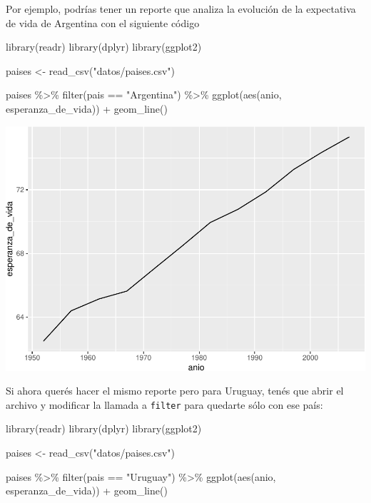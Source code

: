 \documentclass[
  openany]{book}
\newenvironment{Shaded}{\begin{snugshade}}{\end{snugshade}}
\newcommand{\FunctionTok}[1]{\textcolor[rgb]{0.00,0.00,0.00}{#1}}
\newcommand{\NormalTok}[1]{#1}
\newcommand{\OtherTok}[1]{\textcolor[rgb]{0.56,0.35,0.01}{#1}}
\newcommand{\SpecialCharTok}[1]{\textcolor[rgb]{0.00,0.00,0.00}{#1}}
\newcommand{\StringTok}[1]{\textcolor[rgb]{0.31,0.60,0.02}{#1}}
\begin{document}
Por ejemplo, podrías tener un reporte que analiza la evolución de la expectativa de vida de Argentina con el siguiente código

\begin{Shaded}
\begin{Highlighting}[]
\FunctionTok{library}\NormalTok{(readr)}
\FunctionTok{library}\NormalTok{(dplyr)}
\FunctionTok{library}\NormalTok{(ggplot2)}

\NormalTok{paises }\OtherTok{\textless{}{-}} \FunctionTok{read\_csv}\NormalTok{(}\StringTok{"datos/paises.csv"}\NormalTok{)}

\NormalTok{paises }\SpecialCharTok{\%\textgreater{}\%} 
  \FunctionTok{filter}\NormalTok{(pais }\SpecialCharTok{==} \StringTok{"Argentina"}\NormalTok{) }\SpecialCharTok{\%\textgreater{}\%} 
  \FunctionTok{ggplot}\NormalTok{(}\FunctionTok{aes}\NormalTok{(anio, esperanza\_de\_vida)) }\SpecialCharTok{+}
  \FunctionTok{geom\_line}\NormalTok{()}
\end{Highlighting}
\end{Shaded}

\begin{center}\includegraphics[width=1\linewidth]{DT6_files/figure-latex/unnamed-chunk-104-1} \end{center}

Si ahora querés hacer el mismo reporte pero para Uruguay, tenés que abrir el archivo y modificar la llamada a \texttt{filter} para quedarte sólo con ese país:

\begin{Shaded}
\begin{Highlighting}[]
\FunctionTok{library}\NormalTok{(readr)}
\FunctionTok{library}\NormalTok{(dplyr)}
\FunctionTok{library}\NormalTok{(ggplot2)}

\NormalTok{paises }\OtherTok{\textless{}{-}} \FunctionTok{read\_csv}\NormalTok{(}\StringTok{"datos/paises.csv"}\NormalTok{)}

\NormalTok{paises }\SpecialCharTok{\%\textgreater{}\%} 
  \FunctionTok{filter}\NormalTok{(pais }\SpecialCharTok{==} \StringTok{"Uruguay"}\NormalTok{) }\SpecialCharTok{\%\textgreater{}\%} 
  \FunctionTok{ggplot}\NormalTok{(}\FunctionTok{aes}\NormalTok{(anio, esperanza\_de\_vida)) }\SpecialCharTok{+}
  \FunctionTok{geom\_line}\NormalTok{()}
\end{Highlighting}
\end{Shaded}
\end{document}

